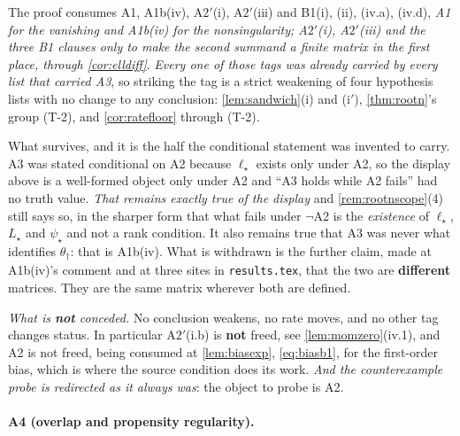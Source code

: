 \begin{assumption}
The
proof consumes A1, A1b(iv), A$2'$(i), A$2'$(iii) and B1(i), (ii), (iv.a), (iv.d), \emph{A1 for the vanishing and
A1b(iv) for the nonsingularity; A$2'$(i), A$2'$(iii) and the three B1 clauses only to make the second
summand a finite matrix in the first place, through \cref{cor:elldiff}}. \emph{Every one of those tags was
already carried by every list
that carried A3}, so striking the tag is a strict weakening of four hypothesis lists with no change to any
conclusion: \cref{lem:sandwich}\textup{(i)} and \textup{(i$'$)}, \cref{thm:rootn}'s group (T-2), and
\cref{cor:ratefloor} through (T-2).

What survives, and it is the half the conditional statement was invented to carry. A3 was stated
conditional on A2 because $\ell_\star$ exists only under A2, so the display above is a well-formed object
only under A2 and ``A3 holds while A2 fails'' had no truth value. \emph{That remains exactly true of the
display} and \cref{rem:rootnscope}\textup{(4)} still says so, in the sharper form that what fails under
$\neg$A2 is the \emph{existence} of $\ell_\star$, $L_\star$ and $\psi_\star$ and not a rank condition. It
also remains true that A3 was never what identifies $\theta_\dagger$: that is A1b(iv). What is
withdrawn is the further claim, made at A1b(iv)'s comment and at three sites in
\texttt{results.tex}, that the two are \textbf{different} matrices. They are the same matrix wherever
both are defined.

\emph{What is \textbf{not} conceded.} No conclusion weakens, no rate moves, and no other tag changes
status. In particular A$2'$(i.b) is \textbf{not} freed, see \cref{lem:momzero}\textup{(iv.1)}, and
A2 is not freed, being consumed at \cref{lem:biasexp}, \eqref{eq:biasb1}, for the first-order bias, which
is where the source condition does its work. \emph{And the counterexample probe is redirected as it always
was}: the object to probe is A2.
\end{assumption}

\paragraph{A4 (overlap and propensity regularity).}

